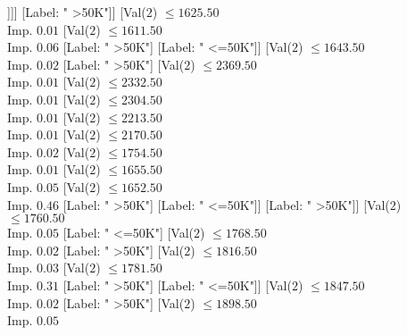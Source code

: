 \documentclass[margin=10pt]{standalone}
\begin{document}
\begin{forest}
																															[Label: " >50K"]
																															[Label: " <=50K"]]]]
																												[Label: " >50K"]]
																											[Val($2$) $ \leq 1625.50$ \\ Imp. $0.01$
																												[Val($2$) $ \leq 1611.50$ \\ Imp. $0.06$
																													[Label: " >50K"]
																													[Label: " <=50K"]]
																												[Val($2$) $ \leq 1643.50$ \\ Imp. $0.02$
																													[Label: " >50K"]
																													[Val($2$) $ \leq 2369.50$ \\ Imp. $0.01$
																														[Val($2$) $ \leq 2332.50$ \\ Imp. $0.01$
																															[Val($2$) $ \leq 2304.50$ \\ Imp. $0.01$
																																[Val($2$) $ \leq 2213.50$ \\ Imp. $0.01$
																																	[Val($2$) $ \leq 2170.50$ \\ Imp. $0.02$
																																		[Val($2$) $ \leq 1754.50$ \\ Imp. $0.01$
																																			[Val($2$) $ \leq 1655.50$ \\ Imp. $0.05$
																																				[Val($2$) $ \leq 1652.50$ \\ Imp. $0.46$
																																					[Label: " >50K"]
																																					[Label: " <=50K"]]
																																				[Label: " >50K"]]
																																			[Val($2$) $ \leq 1760.50$ \\ Imp. $0.05$
																																				[Label: " <=50K"]
																																				[Val($2$) $ \leq 1768.50$ \\ Imp. $0.02$
																																					[Label: " >50K"]
																																					[Val($2$) $ \leq 1816.50$ \\ Imp. $0.03$
																																						[Val($2$) $ \leq 1781.50$ \\ Imp. $0.31$
																																							[Label: " >50K"]
																																							[Label: " <=50K"]]
																																						[Val($2$) $ \leq 1847.50$ \\ Imp. $0.02$
																																							[Label: " >50K"]
																																							[Val($2$) $ \leq 1898.50$ \\ Imp. $0.05$

\end{forest}
\end{document}
